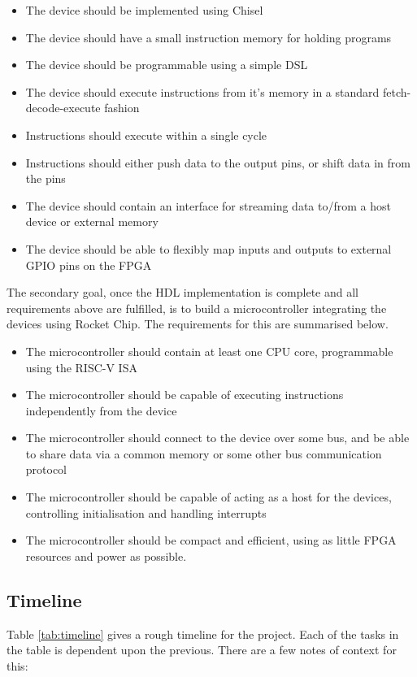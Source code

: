 \documentclass[a4paper,fleqn,12pt]{article}
\begin{document}
\begin{itemize}
	\item The device should be implemented using Chisel
	\item The device should have a small instruction memory for holding programs
	\item The device should be programmable using a simple DSL
	\item The device should execute instructions from it's memory in a standard fetch-decode-execute fashion
	\item Instructions should execute within a single cycle
	\item Instructions should either push data to the output pins, or shift data in from the pins
	\item The device should contain an interface for streaming data to/from a host device or external memory
	\item The device should be able to flexibly map inputs and outputs to external GPIO pins on the FPGA
\end{itemize}

The secondary goal, once the HDL implementation is complete and all requirements above are fulfilled, is to build a microcontroller integrating the devices using Rocket Chip. The requirements for this are summarised below.

\begin{itemize}
	\item The microcontroller should contain at least one CPU core, programmable using the RISC-V ISA
	\item The microcontroller should be capable of executing instructions independently from the device
	\item The microcontroller should connect to the device over some bus, and be able to share data via a common memory or some other bus communication protocol
	\item The microcontroller should be capable of acting as a host for the devices, controlling initialisation and handling interrupts
	\item The microcontroller should be compact and efficient, using as little FPGA resources and power as possible.
\end{itemize}

\subsection{Timeline}

Table \ref{tab:timeline} gives a rough timeline for the project. Each of the tasks in the table is dependent upon the previous. There are a few notes of context for this:
\end{document}
